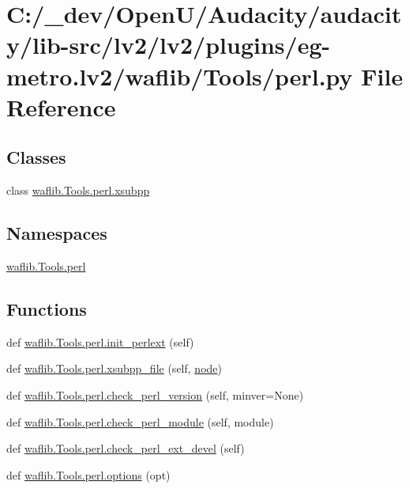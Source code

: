 \hypertarget{lv2_2plugins_2eg-metro_8lv2_2waflib_2_tools_2perl_8py}{}\section{C\+:/\+\_\+dev/\+Open\+U/\+Audacity/audacity/lib-\/src/lv2/lv2/plugins/eg-\/metro.lv2/waflib/\+Tools/perl.py File Reference}
\label{lv2_2plugins_2eg-metro_8lv2_2waflib_2_tools_2perl_8py}
\subsection*{Classes}
\begin{DoxyCompactItemize}
\item 
class \hyperlink{classwaflib_1_1_tools_1_1perl_1_1xsubpp}{waflib.\+Tools.\+perl.\+xsubpp}
\end{DoxyCompactItemize}
\subsection*{Namespaces}
\begin{DoxyCompactItemize}
\item 
 \hyperlink{namespacewaflib_1_1_tools_1_1perl}{waflib.\+Tools.\+perl}
\end{DoxyCompactItemize}
\subsection*{Functions}
\begin{DoxyCompactItemize}
\item 
def \hyperlink{namespacewaflib_1_1_tools_1_1perl_ad690c9b4e0627683b8d8eb680a42daf8}{waflib.\+Tools.\+perl.\+init\+\_\+perlext} (self)
\item 
def \hyperlink{namespacewaflib_1_1_tools_1_1perl_ad98847198592a78a56515c15f095334e}{waflib.\+Tools.\+perl.\+xsubpp\+\_\+file} (self, \hyperlink{structnode}{node})
\item 
def \hyperlink{namespacewaflib_1_1_tools_1_1perl_ac466c27b926b7d70a6643f8d055f62f6}{waflib.\+Tools.\+perl.\+check\+\_\+perl\+\_\+version} (self, minver=None)
\item 
def \hyperlink{namespacewaflib_1_1_tools_1_1perl_a96349a7aa3669ed96474a23459e98246}{waflib.\+Tools.\+perl.\+check\+\_\+perl\+\_\+module} (self, module)
\item 
def \hyperlink{namespacewaflib_1_1_tools_1_1perl_ae2effbe87451eba35dd7aa8cfa8d6b1a}{waflib.\+Tools.\+perl.\+check\+\_\+perl\+\_\+ext\+\_\+devel} (self)
\item 
def \hyperlink{namespacewaflib_1_1_tools_1_1perl_af58a6392e1e27cd335c892a619206093}{waflib.\+Tools.\+perl.\+options} (opt)
\end{DoxyCompactItemize}
